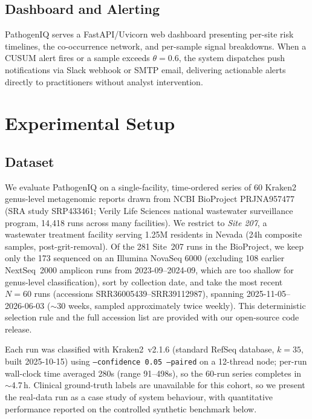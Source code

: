 \documentclass[conference]{IEEEtran}
\begin{document}
\subsection{Dashboard and Alerting}

PathogenIQ serves a FastAPI/Uvicorn web dashboard presenting per-site
risk timelines, the co-occurrence network, and per-sample signal
breakdowns. When a CUSUM alert fires or a sample exceeds $\theta=0.6$,
the system dispatches push notifications via Slack webhook or SMTP email,
delivering actionable alerts directly to practitioners without analyst
intervention.

\section{Experimental Setup}

\subsection{Dataset}

We evaluate PathogenIQ on a single-facility, time-ordered series of 60
Kraken2 genus-level metagenomic reports drawn from NCBI BioProject
PRJNA957477 (SRA study SRP433461; Verily Life Sciences national
wastewater surveillance program, 14{,}418 runs across many facilities).
We restrict to \emph{Site 207}, a wastewater treatment facility serving
1.25M residents in Nevada (24h composite samples, post-grit-removal). Of
the 281 Site~207 runs in the BioProject, we keep only the 173 sequenced
on an Illumina NovaSeq 6000 (excluding 108 earlier NextSeq~2000 amplicon
runs from 2023-09--2024-09, which are too shallow for genus-level
classification), sort by collection date, and take the most recent
$N=60$ runs (accessions SRR36005439--SRR39112987), spanning
2025-11-05--2026-06-03 ($\sim$30 weeks, sampled approximately twice
weekly). This deterministic selection rule and the full accession list
are provided with our open-source code release.

Each run was classified with Kraken2~v2.1.6 (standard RefSeq database,
$k=35$, built 2025-10-15) using \texttt{--confidence 0.05 --paired} on a
12-thread node; per-run wall-clock time averaged 280s (range 91--498s),
so the 60-run series completes in $\sim$4.7\,h. Clinical ground-truth
labels are unavailable for this cohort, so we present the real-data run
as a case study of system behaviour, with quantitative performance
reported on the controlled synthetic benchmark below.
\end{document}
